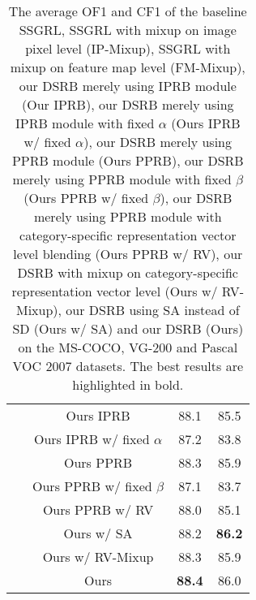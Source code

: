 \documentclass[lettersize,journal]{IEEEtran}
\begin{document}
\begin{table}[!t]
\begin{tabular}{c|c|cc}
  \centering ~ & Ours IPRB & 88.1 & 85.5 \\
  \centering ~ & Ours IPRB w/ fixed $\alpha$ & 87.2 & 83.8 \\
  \centering ~ & Ours PPRB & 88.3 & 85.9 \\
  \centering ~ & Ours PPRB w/ fixed $\beta$ & 87.1 & 83.7 \\
  \centering ~ & Ours PPRB w/ RV & 88.0 & 85.1 \\
  \centering ~ & Ours w/ SA & 88.2 & \textbf{86.2} \\
  \centering ~ & Ours w/ RV-Mixup & 88.3 & 85.9 \\
  \centering ~ & Ours & \textbf{88.4} & 86.0 \\
  \hline
  \end{tabular}
  \vspace{10pt}
  \caption{The average OF1 and CF1 of the baseline SSGRL, SSGRL with mixup on image pixel level (IP-Mixup), SSGRL with mixup on feature map level (FM-Mixup), our DSRB merely using IPRB module (Our IPRB), our DSRB merely using IPRB module with fixed $\alpha$ (Ours IPRB w/ fixed $\alpha$), our DSRB merely using PPRB module (Ours PPRB), our DSRB merely using PPRB module with fixed $\beta$ (Ours PPRB w/ fixed $\beta$), our DSRB merely using PPRB module with category-specific representation vector level blending (Ours PPRB w/ RV), our DSRB with mixup on category-specific representation vector level (Ours w/ RV-Mixup), our DSRB using SA instead of SD (Ours w/ SA) and our DSRB (Ours) on the MS-COCO, VG-200 and Pascal VOC 2007 datasets. The best results are highlighted in bold.}
  \label{tab:average-ablation-results}
\end{table}
\end{document}

